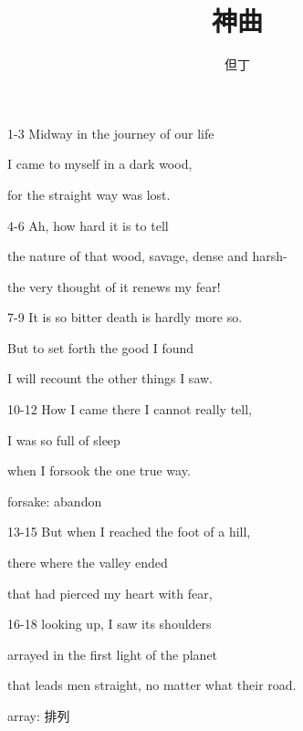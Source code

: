\documentclass[oneside]{ctexbook}
\title{神曲}
\author{但丁}
\begin{document}
\maketitle

\tableofcontents

\chapter{}

\begin{mytext}{1-3}
Midway in the journey of our life

I came to myself in a dark wood,

for the straight way was lost.
\end{mytext}

\begin{mytext}{4-6}
Ah, how hard it is to tell

the nature of that wood, savage, dense and harsh-

the very thought of it renews my fear!
\end{mytext}

\begin{mytext}{7-9}
It is so bitter death is hardly more so.

But to set forth the good I found

I will recount the other things I saw.
\end{mytext}

\begin{mytext}{10-12}
How I came there I cannot really tell,

I was so full of sleep

when I forsook the one true way.

\tcblower

forsake: abandon
\end{mytext}

\begin{mytext}{13-15}
But when I reached the foot of a hill,

there where the valley ended

that had pierced my heart with fear,
\end{mytext}

\begin{mytext}{16-18}
looking up, I saw its shoulders

arrayed in the first light of the planet

that leads men straight, no matter what their road.

\tcblower

array: 排列
\end{mytext}
\end{document}
